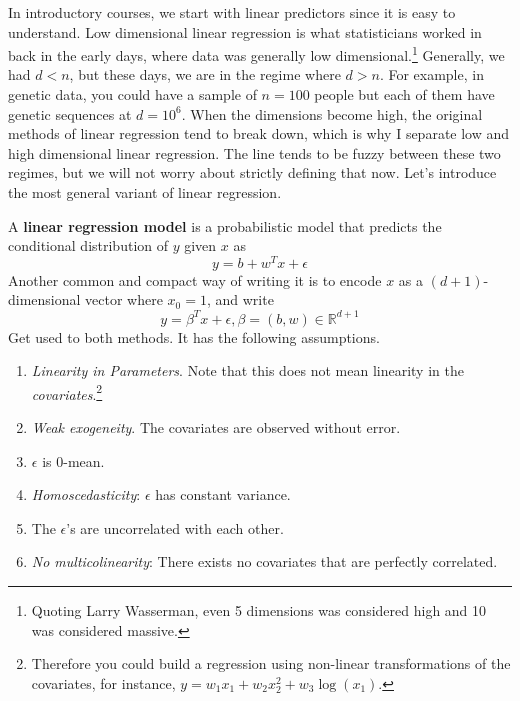 In introductory courses, we start with linear predictors since it is easy to understand. Low dimensional linear regression is what statisticians worked in back in the early days, where data was generally low dimensional.\footnote{Quoting Larry Wasserman, even 5 dimensions was considered high and 10 was considered massive. } Generally, we had $d < n$, but these days, we are in the regime where $d > n$. For example, in genetic data, you could have a sample of $n = 100$ people but each of them have genetic sequences at $d = 10^6$. When the dimensions become high, the original methods of linear regression tend to break down, which is why I separate low and high dimensional linear regression. The line tends to be fuzzy between these two regimes, but we will not worry about strictly defining that now. Let's introduce the most general variant of linear regression. 

\begin{definition}
  A \textbf{linear regression model} is a probabilistic model that predicts the conditional distribution of $y$ given $x$ as 
  \begin{equation}
    y = b + w^T x + \epsilon
  \end{equation}
  Another common and compact way of writing it is to encode $x$ as a $(d+1)$-dimensional vector where $x_0 = 1$, and write 
  \begin{equation}
    y = \beta^T x + \epsilon, \beta = (b, w) \in \mathbb{R}^{d+1}
  \end{equation}
  Get used to both methods. It has the following assumptions. 
  \begin{enumerate}
    \item \textit{Linearity in Parameters}. Note that this does not mean linearity in the \textit{covariates}.\footnote{Therefore you could build a regression using non-linear transformations of the covariates, for instance, $y = w_1 x_1 + w_2 x_2^2 + w_3 \log(x_1)$. }
    \item \textit{Weak exogeneity}. The covariates are observed without error. 
    \item $\epsilon$ is $0$-mean. 
    \item \textit{Homoscedasticity}: $\epsilon$ has constant variance. 
    \item The $\epsilon$'s are uncorrelated with each other. 
    \item \textit{No multicolinearity}: There exists no covariates that are perfectly correlated. 
  \end{enumerate}
\end{definition} 

